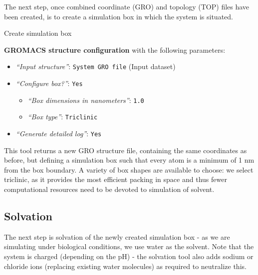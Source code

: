 \documentclass[twocolumn]{bmcart}%
\providecommand{\tightlist}{%
  \setlength{\itemsep}{0pt}\setlength{\parskip}{0pt}}
\begin{document}
The next step, once combined coordinate (GRO) and topology (TOP) files
have been created, is to create a simulation box in which the system is
situated.

\begin{handson_box_colour}{Create simulation box}


  \textbf{GROMACS structure configuration} with the following
  parameters:

  \begin{itemize}
  \item
    \emph{``Input structure''}: \texttt{System\ GRO\ file} (Input
    dataset)
  \item
    \emph{``Configure box?''}: \texttt{Yes}

    \begin{itemize}
    \item
      \emph{``Box dimensions in nanometers''}: \texttt{1.0}
    \item
      \emph{``Box type''}: \texttt{Triclinic}
    \end{itemize}
  \item
    \emph{``Generate detailed log''}: \texttt{Yes}
  \end{itemize}

\end{handson_box_colour}

This tool returns a new GRO structure file, containing the same coordinates as before, but defining a simulation box such that every atom is a minimum of 1 nm from the box boundary. A variety of box shapes are available to choose: we select triclinic, as it provides the most efficient packing in space and thus fewer computational resources need to be devoted to simulation of solvent. 

\subsection*{Solvation}\label{solvation}
The next step is solvation of the newly created simulation box - as we are simulating under biological conditions, we use water as the solvent. Note
that the system is charged (depending on the pH) - the solvation tool
also adds sodium or chloride ions (replacing existing water molecules) as required to neutralize this.
\end{document}
